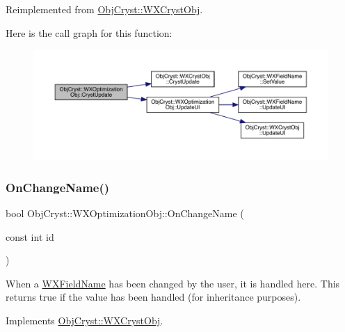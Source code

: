 Reimplemented from \mbox{\hyperlink{class_obj_cryst_1_1_w_x_cryst_obj_a1ea28fa0a66b5163b66bf42a8d1451b3}{Obj\+Cryst\+::\+W\+X\+Cryst\+Obj}}.

Here is the call graph for this function\+:
\nopagebreak
\begin{figure}[H]
\begin{center}
\leavevmode
\includegraphics[width=350pt]{class_obj_cryst_1_1_w_x_optimization_obj_a742684b478a21cec25a74c2b39914d80_cgraph}
\end{center}
\end{figure}
\mbox{\label{class_obj_cryst_1_1_w_x_optimization_obj_a01117540dd4857fd238caf16c391a691}} 
\subsubsection{\texorpdfstring{OnChangeName()}{OnChangeName()}}
{\footnotesize\ttfamily bool Obj\+Cryst\+::\+W\+X\+Optimization\+Obj\+::\+On\+Change\+Name (\begin{DoxyParamCaption}\item[{const int}]{id }\end{DoxyParamCaption})\hspace{0.3cm}{\ttfamily [virtual]}}

When a \mbox{\hyperlink{class_obj_cryst_1_1_w_x_field_name}{W\+X\+Field\+Name}} has been changed by the user, it is handled here. This returns true if the value has been handled (for inheritance purposes). 

Implements \mbox{\hyperlink{class_obj_cryst_1_1_w_x_cryst_obj_a3736357599263df7e550790753c040a3}{Obj\+Cryst\+::\+W\+X\+Cryst\+Obj}}.

